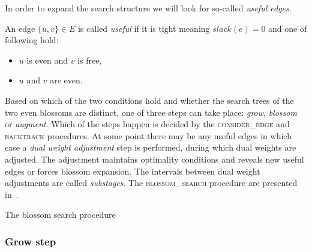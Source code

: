 In order to expand the search structure we will look for so-called \emph{useful edges}.

\begin{defn}
    An edge $\{u, v\} \in E$ is called \emph{useful} if it is tight meaning $slack(e) = 0$ and one of following hold:

    \begin{itemize}
        \item $u$ is even and $v$ is free,
        \item $u$ and $v$ are even.
    \end{itemize}
\end{defn}

Based on which of the two conditions hold and whether the search trees of the two even blossoms are distinct, one of three steps can take place: \emph{grow}, \emph{blossom} or \emph{augment}. Which of the steps happen is decided by the \textsc{consider\_edge} and \textsc{backtrack} procedures. At some point there may be any useful edges in which case a \emph{dual weight adjustment} step is performed, during which dual weights are adjusted. The adjustment maintains optimality conditions and reveals new useful edges or forces blossom expansion. The intervals between dual weight adjustments are called \emph{substages}. The \textsc{blossom\_search} procedure are presented in~.

\begin{algorithm}
\caption{The blossom search procedure}\label{alg:blossom_search}
\begin{algorithmic}[1]
    \Else
    \EndIf
\EndFor
\State
{}
    \EndWhile
\EndWhile
\EndProcedure
\State
{}
\Else{}
\EndIf
\EndProcedure
\end{algorithmic}
\end{algorithm}

\subsubsection*{Grow step}

